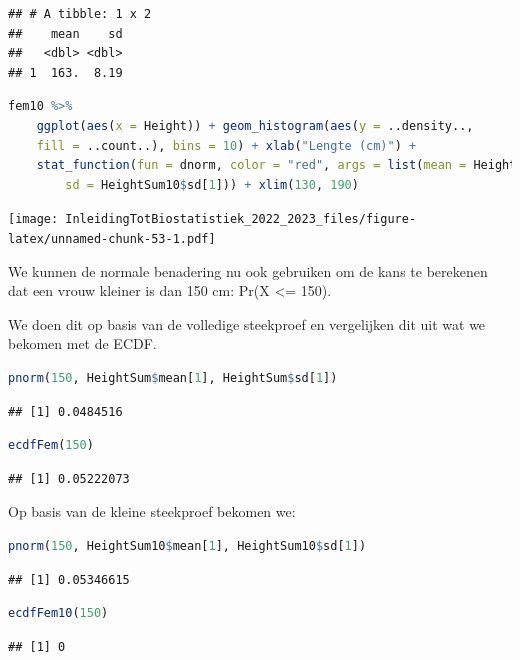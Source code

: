 \documentclass[
  12pt,dutch,coursenotes]{book}
\begin{document}
\begin{lstlisting}
## # A tibble: 1 x 2
##    mean    sd
##   <dbl> <dbl>
## 1  163.  8.19
\end{lstlisting}

\begin{lstlisting}[language=R]
fem10 %>%
    ggplot(aes(x = Height)) + geom_histogram(aes(y = ..density..,
    fill = ..count..), bins = 10) + xlab("Lengte (cm)") +
    stat_function(fun = dnorm, color = "red", args = list(mean = HeightSum10$mean[1],
        sd = HeightSum10$sd[1])) + xlim(130, 190)
\end{lstlisting}

\texttt{[image: InleidingTotBiostatistiek\_2022\_2023\_files/figure-latex/unnamed-chunk-53-1.pdf]}

We kunnen de normale benadering nu ook gebruiken om de kans te berekenen dat een vrouw kleiner is dan 150 cm: Pr(X \textless= 150).

We doen dit op basis van de volledige steekproef en vergelijken dit uit wat we bekomen met de ECDF.

\begin{lstlisting}[language=R]
pnorm(150, HeightSum$mean[1], HeightSum$sd[1])
\end{lstlisting}

\begin{lstlisting}
## [1] 0.0484516
\end{lstlisting}

\begin{lstlisting}[language=R]
ecdfFem(150)
\end{lstlisting}

\begin{lstlisting}
## [1] 0.05222073
\end{lstlisting}

Op basis van de kleine steekproef bekomen we:

\begin{lstlisting}[language=R]
pnorm(150, HeightSum10$mean[1], HeightSum10$sd[1])
\end{lstlisting}

\begin{lstlisting}
## [1] 0.05346615
\end{lstlisting}

\begin{lstlisting}[language=R]
ecdfFem10(150)
\end{lstlisting}

\begin{lstlisting}
## [1] 0
\end{lstlisting}
\end{document}
